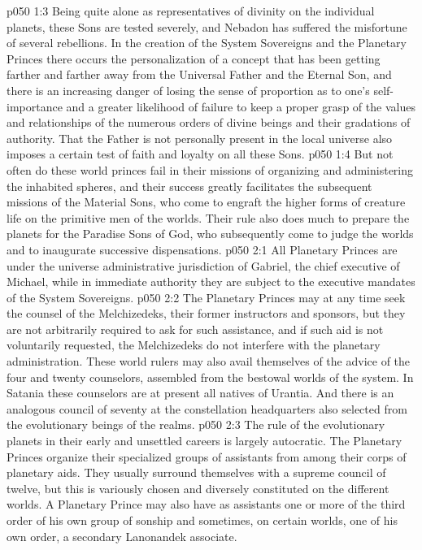 \vs p050 1:3 Being quite alone as representatives of divinity on the individual planets, these Sons are tested severely, and Nebadon has suffered the misfortune of several rebellions. In the creation of the System Sovereigns and the Planetary Princes there occurs the personalization of a concept that has been getting farther and farther away from the Universal Father and the Eternal Son, and there is an increasing danger of losing the sense of proportion as to one’s self\hyp{}importance and a greater likelihood of failure to keep a proper grasp of the values and relationships of the numerous orders of divine beings and their gradations of authority. That the Father is not personally present in the local universe also imposes a certain test of faith and loyalty on all these Sons.
\vs p050 1:4 But not often do these world princes fail in their missions of organizing and administering the inhabited spheres, and their success greatly facilitates the subsequent missions of the Material Sons, who come to engraft the higher forms of creature life on the primitive men of the worlds. Their rule also does much to prepare the planets for the Paradise Sons of God, who subsequently come to judge the worlds and to inaugurate successive dispensations.
\vs p050 2:1 All Planetary Princes are under the universe administrative jurisdiction of Gabriel, the chief executive of Michael, while in immediate authority they are subject to the executive mandates of the System Sovereigns.
\vs p050 2:2 The Planetary Princes may at any time seek the counsel of the Melchizedeks, their former instructors and sponsors, but they are not arbitrarily required to ask for such assistance, and if such aid is not voluntarily requested, the Melchizedeks do not interfere with the planetary administration. These world rulers may also avail themselves of the advice of the four and twenty counselors, assembled from the bestowal worlds of the system. In Satania these counselors are at present all natives of Urantia. And there is an analogous council of seventy at the constellation headquarters also selected from the evolutionary beings of the realms.
\vs p050 2:3 The rule of the evolutionary planets in their early and unsettled careers is largely autocratic. The Planetary Princes organize their specialized groups of assistants from among their corps of planetary aids. They usually surround themselves with a supreme council of twelve, but this is variously chosen and diversely constituted on the different worlds. A Planetary Prince may also have as assistants one or more of the third order of his own group of sonship and sometimes, on certain worlds, one of his own order, a secondary Lanonandek associate.
